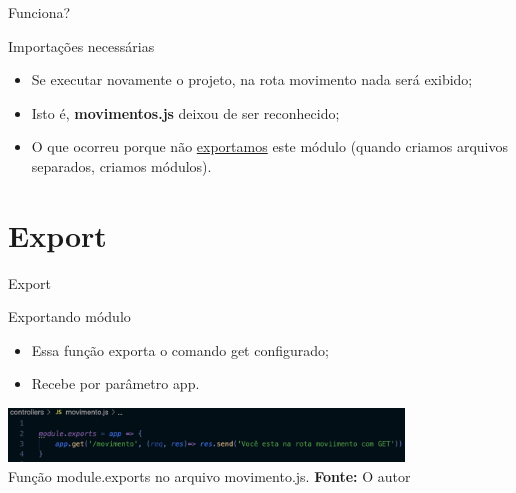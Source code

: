 \documentclass{beamer}
\begin{document}
    \begin{frame}[label=lists]{Funciona?}
		\begin{exampleblock}{Importações necessárias}
	\begin{itemize}
	\item Se executar novamente o projeto, na rota movimento nada será exibido;
	\item Isto é, \textbf{movimentos.js} deixou de ser reconhecido;
	\item O que ocorreu porque não \underline{exportamos} este módulo (quando criamos arquivos separados, criamos módulos).
	\end{itemize}
	\end{exampleblock}
    \end{frame}
   
 \section{Export}
    \begin{frame}[label=lists]{Export}
	\begin{exampleblock}{Exportando módulo}
		\begin{itemize}
			\item Essa função exporta o comando get configurado;
			\item Recebe por parâmetro \alert{app}.
		\end{itemize}
	\end{exampleblock}
	 \includegraphics[width=105mm]{resources/aula4_6.png}\\
            \tiny{Função module.exports no arquivo movimento.js. \textbf{Fonte:} O autor}

    \end{frame}
   
\end{document}

